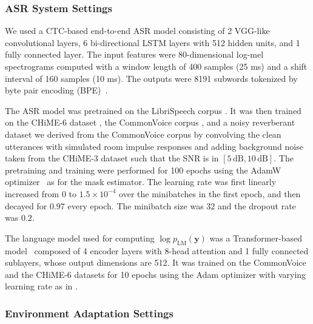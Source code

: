 \documentclass[a4paper]{article}
\def\y{\mathbf{y}}
\begin{document}
\subsubsection{ASR System Settings} \label{sec:asr_system}

We used a CTC-based \cite{graves_connectionist_2006} end-to-end ASR model
consisting of
2 VGG-like convolutional layers,
6 bi-directional LSTM layers with 512 hidden units,
and 1 fully connected layer.
The input features were 80-dimensional log-mel spectrograms
computed with a window length of 400 samples (25 ms)
and a shift interval of 160 samples (10 ms).
The outputs were 8191 subwords tokenized by byte pair encoding (BPE)~\cite{sennrich-etal-2016-neural}.

The ASR model was pretrained on the LibriSpeech corpus \cite{panayotov_librispeech_2015}.
It was then trained on 
the CHiME-6 dataset \cite{watanabe20b_chime},
the CommonVoice corpus \cite{commonvoice:2020},
and a noisy reverberant dataset we derived from the CommonVoice corpus
by convolving the clean utterances with simulated room impulse responses
and adding background noise taken from the CHiME-3 dataset \cite{barker_third_2015}
such that the SNR is in $[5\,\text{dB}, 10\,\text{dB}]$.
The pretraining and training were performed for 100 epochs
using the AdamW optimizer~\cite{loshchilov_decoupled_2019}
as for the mask estimator.
The learning rate was
first linearly increased from $0$ to $1.5 \times 10^{-4}$ over the minibatches in the first epoch,
and then decayed for $0.97$ every epoch.
The minibatch size was $32$ and the dropout rate was $0.2$.

The language model used for
computing $\log p_\mathrm{LM}(\y)$
was a Transformer-based model~\cite{NIPS2017_3f5ee243}
composed of 
4 encoder layers with 8-head attention and 1 fully connected sublayers,
whose output dimensions are 512.
It was trained on the CommonVoice and the CHiME-6 datasets
for 10 epochs
using the Adam optimizer
with varying learning rate as in \cite[Sec. 5.3]{NIPS2017_3f5ee243}.

\subsubsection{Environment Adaptation Settings}
\end{document}
